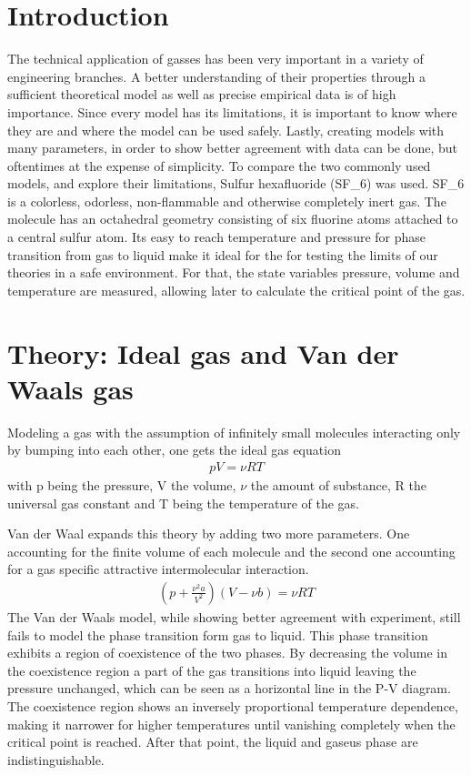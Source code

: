 \documentclass[a4paper,10pt,twocolumn]{article}
\begin{document}
    \section{Introduction}\label{sec:introdction}
    The technical application of gasses has been very important in a variety of engineering branches. 
    A better understanding of their properties through a sufficient theoretical model as well as precise empirical data is of high importance.
    Since every model has its limitations, it is important to know where they are and where the model can be used safely.
    Lastly, creating models with many parameters, in order to show better agreement with data can be done, but oftentimes at the expense of simplicity.
    To compare the two commonly used models, and explore their limitations, Sulfur hexafluoride (SF_6\)) was used.
    SF_6\) is a colorless, odorless, non-flammable and otherwise completely inert gas. 
    The molecule has an octahedral geometry consisting of six fluorine atoms attached to a central sulfur atom.
    Its easy to reach temperature and pressure for phase transition from gas to liquid make it ideal for the for testing the limits of our theories in a safe environment.
    For that, the state variables pressure, volume and temperature are measured, allowing later to calculate the critical point of the gas.
    \section{Theory: Ideal gas and Van der Waals gas}\label{sec:theory}
    Modeling a gas with the assumption of infinitely small molecules interacting only by bumping into each other, one gets the ideal gas equation
    \begin{align}
        pV=\nu RT
    \end{align}
    with p being the pressure, V the volume, $\nu$ the amount of substance, R the universal gas constant and T being the temperature of the gas.
    
    Van der Waal expands this theory by adding two more parameters.
    One accounting for the finite volume of each molecule and the second one accounting for a gas specific attractive intermolecular interaction.
    \begin{align}
    (p+\frac{\nu^2 a}{V^2})(V-\nu b) = \nu RT
    \end{align}
    The Van der Waals model, while showing better agreement with experiment, still fails to model the phase transition form gas to liquid.
    This phase transition exhibits a region of coexistence of the two phases. 
    By decreasing the volume in the coexistence region a part of the gas transitions into liquid leaving the pressure unchanged, which can be seen as a horizontal line in the P-V diagram.
    The coexistence region shows an inversely proportional temperature dependence, making it narrower for higher temperatures until vanishing completely when the critical point is reached.
    After that point, the liquid and gaseus phase are indistinguishable.
\end{document}
